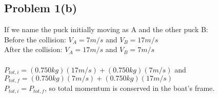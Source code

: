 \documentclass[11pt]{article}
\begin{document}
\subsection*{Problem 1(b)}
If we name the puck initially moving as A and the other puck B:\\
Before the collision: $V_A = 7 m/s$ and $V_B = 17m/s$\\
After the collision: $V_A = 17 m/s$ and $V_B = 7m/s$\\\\
$P_{tot,i} = (0.750kg)(17m/s) + (0.750kg)(7m/s)$ and $P_{tot,f} = (0.750kg)(7m/s) + (0.750kg)(17m/s)$\\
$P_{tot,i} = P_{tot,f}$, so total momentum is conserved in the boat's frame.
\end{document}
